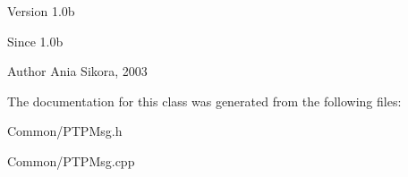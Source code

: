 \begin{DoxyVersion}{Version}
1.\-0b 
\end{DoxyVersion}
\begin{DoxySince}{Since}
1.\-0b 
\end{DoxySince}
\begin{DoxyAuthor}{Author}
Ania Sikora, 2003 
\end{DoxyAuthor}


The documentation for this class was generated from the following files\-:\begin{DoxyCompactItemize}
\item 
Common/P\-T\-P\-Msg.\-h\item 
Common/P\-T\-P\-Msg.\-cpp\end{DoxyCompactItemize}
